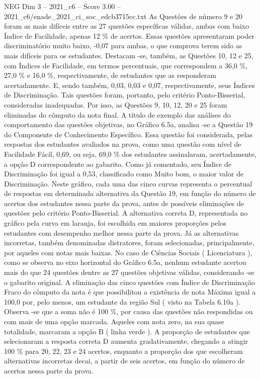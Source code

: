 \begin{textsample}{NEG Dim 3 – 2021\_c6 – Score 3.00 – 2021\_c6/enade\_2021\_ci\_soc\_edcb3715cc.txt}
As Questões de número 9 e 20 foram as mais difíceis entre as 27 questões específicas válidas, ambas com baixo Índice de Facilidade, apenas 12 \% de acertos.
Essas questões apresentaram poder discriminatório muito baixo, -0,07 para ambas, o que comprova terem sido as mais difíceis para os estudantes.
Destacam -se, também, as Questões 10, 12 e 25, com Índices de Facilidade, em termos percentuais, que correspondem a 36,0 \%, 27,0 \% e 16,0 \%, respectivamente, de estudantes que as responderam acertadamente.
E, sendo também, 0,03, 0,03 e 0,07, respectivamente, seus Índices de Discriminação.
Tais questões foram, portanto, pelo critério Ponto-Bisserial, consideradas inadequadas.
Por isso, as Questões 9, 10, 12, 20 e 25 foram eliminadas do cômputo da nota final.
A título de exemplo das análises do comportamento das questões objetivas, no Gráfico 6.5a, analisa -se a Questão 19 do Componente de Conhecimento Específico.
Essa questão foi considerada, pelas respostas dos estudantes avaliados na prova, como uma questão com nível de Facilidade Fácil, 0,69, ou seja, 69,0 \% dos estudantes assinalaram, acertadamente, a opção D correspondente ao gabarito.
Como já comentado, seu Índice de Discriminação foi igual a 0,53, classificado como Muito bom, o maior valor de Discriminação.
Neste gráfico, cada uma das cinco curvas representa o percentual de respostas em determinada alternativa da Questão 19, em função do número de acertos dos estudantes nessa parte da prova, antes de possíveis eliminações de questões pelo critério Ponto-Bisserial.
A alternativa correta D, representada no gráfico pela curva em laranja, foi escolhida em maiores proporções pelos estudantes com desempenho melhor nessa parte da prova.
Já as alternativas incorretas, também denominadas distratores, foram selecionadas, principalmente, por aqueles com notas mais baixas.
No caso de Ciências Sociais ( Licenciatura ), como se observa no eixo horizontal do Gráfico 6.5a, nenhum estudante acertou mais do que 24 questões dentre as 27 questões objetivas válidas, considerando -se o gabarito original.
A eliminação das cinco questões com Índice de Discriminação Fraco do cômputo da nota é que possibilitou a existência de nota Máxima igual a 100,0 por, pelo menos, um estudante da região Sul ( visto na Tabela 6.10a ).
Observa -se que a soma não é 100 \%, por causa das questões não respondidas ou com mais de uma opção marcada.
Aqueles com nota zero, na sua quase totalidade, marcaram a opção B ( linha verde ).
A proporção de estudantes que selecionaram a resposta correta D aumenta gradativamente, chegando a atingir 100 \% para 20, 22, 23 e 24 acertos, enquanto a proporção dos que escolheram alternativas incorretas decai, a partir de seis acertos, em função do número de acertos nessa parte da prova.

\end{textsample}
